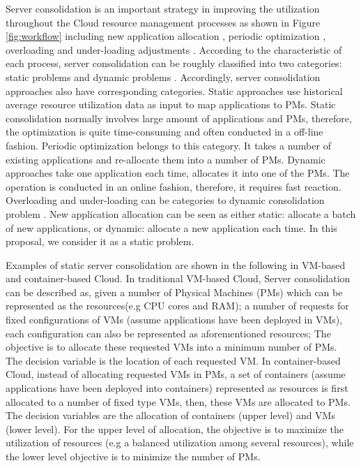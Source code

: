 Server consolidation is an important strategy in improving the utilization throughout the Cloud resource management processes as shown in Figure \ref{fig:workflow} including new application allocation \cite{Jennings:2015ht}, periodic optimization \cite{Mishra:2012kx}, overloading and under-loading adjustments \cite{Mishra:2012kx}. According to the characteristic of each process, server consolidation can be roughly classified into two categories: static problems \cite{Mishra:2012kx, Xiao:2015ue} and dynamic problems \cite{Beloglazov:2012bw}.
Accordingly, server consolidation approaches also have corresponding categories. Static approaches use historical average resource utilization data as input to map applications to PMs. Static consolidation normally involves large amount of applications and PMs, therefore, the optimization is quite time-consuming and often conducted in a off-line fashion. Periodic optimization belongs to this category. It takes a number of existing applications and re-allocate them into a number of PMs. 
Dynamic approaches take one application each time, allocates it into one of the PMs. The operation is conducted in an online fashion, therefore, it requires fast reaction. Overloading  and under-loading can be categories to dynamic consolidation problem \cite{Beloglazov:2013ht}. New application allocation can be seen as either static: allocate a batch of new applications, or dynamic: allocate a new application each time. In this proposal, we consider it as a static problem. 

Examples of static server consolidation are shown in the following in VM-based and container-based Cloud. In traditional VM-based Cloud, Server consolidation can be described as, given a number of Physical Machines (PMs) which can be represented as the resources(e.g CPU cores and RAM); a number of requests for fixed configurations of VMs (assume applications have been deployed in VMs), each configuration can also be represented as aforementioned resources; The objective is to allocate these requested VMs into a minimum number of PMs. The decision variable is the location of each requested VM. In container-based Cloud, instead of allocating requested VMs in PMs, a set of containers (assume applications have been deployed into containers) represented as resources is first allocated to a number of fixed type VMs, then, these VMs are allocated to PMs. The decision variables are the allocation of containers (upper level) and VMs (lower level). For the upper level of allocation, the objective is to maximize the utilization of resources (e.g a balanced utilization among several resources), while the lower level objective is to minimize the number of PMs.

